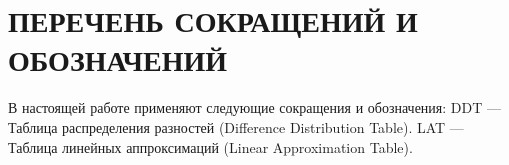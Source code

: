 \section*{ПЕРЕЧЕНЬ СОКРАЩЕНИЙ И ОБОЗНАЧЕНИЙ}

В настоящей работе применяют следующие сокращения и обозначения:\newline
DDT — Таблица распределения разностей (Difference Distribution Table). \newline
LAT — Таблица линейных аппроксимаций (Linear Approximation Table).
